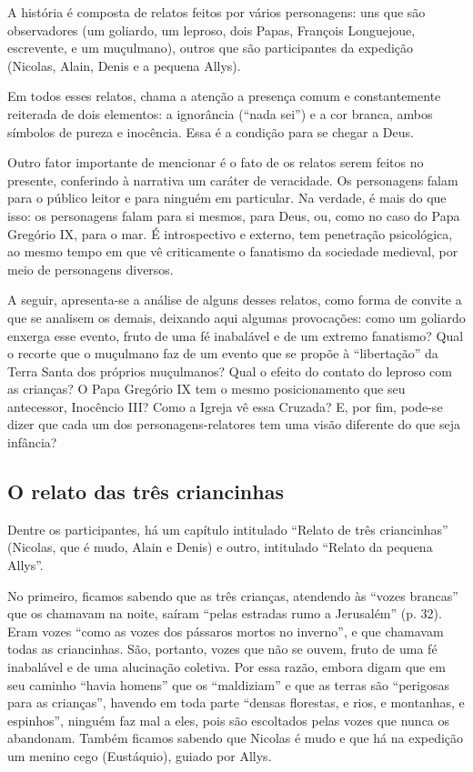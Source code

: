 \documentclass[12pt]{extarticle}
\begin{document}
A história é composta de relatos feitos por vários personagens: uns que
são observadores (um goliardo, um leproso, dois Papas, François
Longuejoue, escrevente, e um muçulmano), outros que são participantes da
expedição (Nicolas, Alain, Denis e a pequena Allys).

Em todos esses relatos, chama a atenção a presença comum e
constantemente reiterada de dois elementos: a ignorância (``nada sei'')
e a cor branca, ambos símbolos de pureza e inocência. Essa é a condição
para se chegar a Deus.

Outro fator importante de mencionar é o fato de os relatos serem feitos
no presente, conferindo à narrativa um caráter de veracidade. Os
personagens falam para o público leitor e para ninguém em particular. Na
verdade, é mais do que isso: os personagens falam para si mesmos, para
Deus, ou, como no caso do Papa Gregório IX, para o mar. É introspectivo
e externo, tem penetração psicológica, ao mesmo tempo em que vê
criticamente o fanatismo da sociedade medieval, por meio de personagens
diversos.

A seguir, apresenta-se a análise de alguns desses relatos, como forma de
convite a que se analisem os demais, deixando aqui algumas provocações:
como um goliardo enxerga esse evento, fruto de uma fé inabalável e de um
extremo fanatismo? Qual o recorte que o muçulmano faz de um evento que
se propõe à ``libertação'' da Terra Santa dos próprios muçulmanos? Qual
o efeito do contato do leproso com as crianças? O Papa Gregório IX tem o
mesmo posicionamento que seu antecessor, Inocêncio III? Como a Igreja vê
essa Cruzada? E, por fim, pode-se dizer que cada um dos
personagens-relatores tem uma visão diferente do que seja infância?

\subsection{O relato das três criancinhas}

Dentre os participantes, há um capítulo intitulado ``Relato de três
criancinhas'' (Nicolas, que é mudo, Alain e Denis) e outro, intitulado
``Relato da pequena Allys''.

No primeiro, ficamos sabendo que as três crianças, atendendo às ``vozes
brancas'' que os chamavam na noite, saíram ``pelas estradas rumo a
Jerusalém'' (p. 32). Eram vozes ``como as vozes dos pássaros mortos no
inverno'', e que chamavam todas as criancinhas. São, portanto, vozes que
não se ouvem, fruto de uma fé inabalável e de uma alucinação coletiva.
Por essa razão, embora digam que em seu caminho ``havia homens'' que os
``maldiziam'' e que as terras são ``perigosas para as crianças'',
havendo em toda parte ``densas florestas, e rios, e montanhas, e
espinhos'', ninguém faz mal a eles, pois são escoltados pelas vozes que
nunca os abandonam. Também ficamos sabendo que Nicolas é mudo e que há
na expedição um menino cego (Eustáquio), guiado por Allys.
\end{document}

